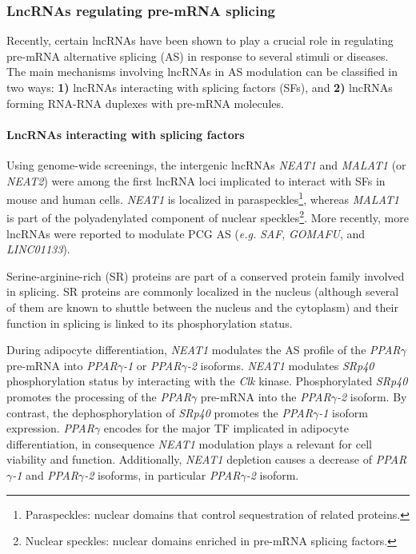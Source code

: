 \subsubsection{LncRNAs regulating pre-mRNA splicing}
\label{subsub-sec:lncRNA-isoform}

Recently, certain lncRNAs have been shown to play a crucial role in regulating pre-mRNA alternative splicing (AS) in response to several stimuli or diseases.\autocite{romero_2018_splicing,he_2019_lncRNA_splicing} The main mechanisms involving lncRNAs in AS modulation can be classified in two ways: \textbf{1)} lncRNAs interacting with splicing factors (SFs), and \textbf{2)} lncRNAs forming RNA-RNA duplexes with pre-mRNA molecules. 

\paragraph{LncRNAs interacting with splicing factors}
\label{paragraph:lncRNA_sf}

Using genome-wide screenings, the intergenic lncRNAs \textit{NEAT1} and \textit{MALAT1} (or \textit{NEAT2}) were among the first lncRNA loci implicated to interact with SFs in mouse and human cells.\autocite{romero_2018_splicing} \textit{NEAT1}\autocite{romero_2018_splicing,statello_2021_lncRNA_reg} is localized in paraspeckles\footnote{Paraspeckles: nuclear domains that control sequestration of related proteins.}, whereas \textit{MALAT1}\autocite{romero_2018_splicing,statello_2021_lncRNA_reg} is part of the polyadenylated component of nuclear speckles\footnote{Nuclear speckles: nuclear domains enriched in pre-mRNA splicing factors.}. More recently, more lncRNAs were reported to modulate PCG AS (\textit{e.g.} \textit{SAF}, \textit{GOMAFU}, and \textit{LINC01133}).

Serine-arginine-rich (SR) proteins are part of a conserved protein family involved in splicing.\autocite{romero_2018_splicing} SR proteins are commonly localized in the nucleus (although several of them are known to shuttle between the nucleus and the cytoplasm) and their function in splicing is linked to its phosphorylation status.\autocite{romero_2018_splicing}

During adipocyte differentiation, \textit{NEAT1} modulates the AS profile of the \textit{PPAR}$\gamma$ pre-mRNA into \textit{PPAR}$\gamma$\textit{-1} or \textit{PPAR}$\gamma$\textit{-2} isoforms. \textit{NEAT1} modulates \textit{SRp40} phosphorylation status by interacting with the \textit{Clk} kinase.\autocite{jiang_2009_akt2} Phosphorylated \textit{SRp40} promotes the processing of the \textit{PPAR}$\gamma$ pre-mRNA into the \textit{PPAR}$\gamma$\textit{-2} isoform. By contrast, the dephosphorylation of \textit{SRp40} promotes the \textit{PPAR}$\gamma$\textit{-1} isoform expression.\autocite{cooper_2014_neat1} \textit{PPAR}$\gamma$ encodes for the major TF implicated in adipocyte differentiation, in consequence \textit{NEAT1} modulation plays a relevant for cell viability and function. Additionally, \textit{NEAT1} depletion causes a decrease of \textit{PPAR}$\gamma$\textit{-1} and \textit{PPAR}$\gamma$\textit{-2} isoforms, in particular \textit{PPAR}$\gamma$\textit{-2} isoform.  

